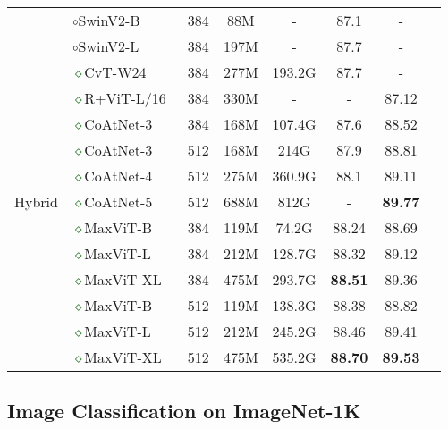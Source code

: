 \documentclass[runningheads]{llncs}
\begin{document}
\begin{table*}[t]
\begin{tabular}{c|l|cccccc}
& \textcolor{brickred}{$\circ$}SwinV2-B~\cite{liu2021swin} & 384 & 88M & - &  87.1 & - \\
& \textcolor{brickred}{$\circ$}SwinV2-L~\cite{liu2021swin} & 384 & 197M & -& 87.7 & - \\
\midrule
\multirow{11}{*}{Hybrid} &
\textcolor{darkgreen}{$\diamond$}CvT-W24~\cite{wu2021cvt} & 384 & 277M & 193.2G &  87.7 & - \\
& \textcolor{darkgreen}{$\diamond$}R+ViT-L/16~\cite{dosovitskiy2020image} & 384 & 330M & - & - & 87.12 \\
& \textcolor{darkgreen}{$\diamond$}CoAtNet-3~\cite{dai2021coatnet} & 384 & 168M & 107.4G &  87.6 & 88.52 \\
& \textcolor{darkgreen}{$\diamond$}CoAtNet-3~\cite{dai2021coatnet} & 512 & 168M & 214G &  87.9 & 88.81 \\
& \textcolor{darkgreen}{$\diamond$}CoAtNet-4~\cite{dai2021coatnet} & 512 & 275M & 360.9G &  88.1 & 89.11 \\
& \textcolor{darkgreen}{$\diamond$}CoAtNet-5~\cite{dai2021coatnet} & 512 & 688M & 812G &  - & \textbf{89.77} \\
\cmidrule(lr){2-7}
& \textcolor{darkgreen}{$\diamond$}MaxViT-B & 384 & 119M & 74.2G  & 88.24 & 88.69 \\
& \textcolor{darkgreen}{$\diamond$}MaxViT-L & 384 & 212M & 128.7G & 88.32 & 89.12 \\
& \textcolor{darkgreen}{$\diamond$}MaxViT-XL & 384 & 475M & 293.7G & \textbf{88.51} &  89.36 \\
\cmidrule(lr){2-7}
& \textcolor{darkgreen}{$\diamond$}MaxViT-B & 512 & 119M & 138.3G & 88.38 &  88.82 \\
& \textcolor{darkgreen}{$\diamond$}MaxViT-L & 512 &  212M & 245.2G & 88.46 &  89.41 \\
& \textcolor{darkgreen}{$\diamond$}MaxViT-XL & 512 & 475M & 535.2G & \textbf{88.70} & \textbf{89.53}  \\
\end{tabular}
\end{table*}


\subsection{Image Classification on ImageNet-1K}
\end{document}
